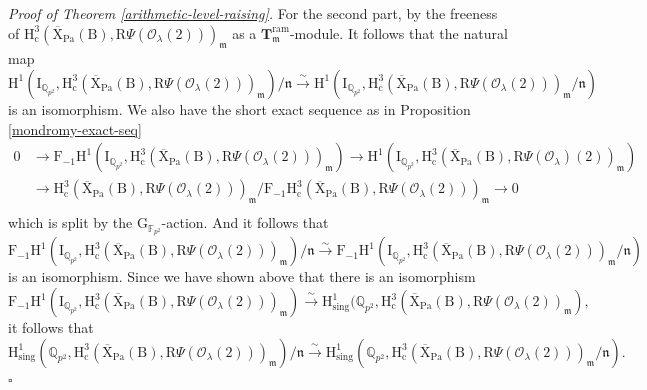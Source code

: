 \documentclass[10pt]{amsart}
\numberwithin{equation}{section}
\theoremstyle{definition}
\newenvironment{myproof}[2] {\emph{Proof of {#1} {#2}.}}{\hfill$\square$}
\def\ram{\mathrm{ram}}
\def\Pa{\mathrm{Pa}}
\def\sing{\mathrm{sing}}
\def\calO{\mathcal{O}}
\def\fracm{\mathfrak{m}}
\def\fracn{\mathfrak{n}}
\def\FF{\mathbb{F}}
\def\QQ{\mathbb{Q}}
\def\bfT{\mathbf{T}}
\def\rmc{\mathrm{c}}
\def\rmB{\mathrm{B}}
\def\rmF{\mathrm{F}}
\def\rmG{\mathrm{G}}
\def\rmH{\mathrm{H}}
\def\rmI{\mathrm{I}}
\def\rmR{\mathrm{R}}
\def\rmX{\mathrm{X}}
\begin{document}
\begin{myproof}{Theorem}{\ref{arithmetic-level-raising}}
For the second part, by the freeness of $\rmH^{3}_{\rmc}(\overline{\rmX}_{\Pa}(\rmB), \rmR\Psi(\calO_{\lambda}(2)))_{\fracm}$ as a $\bfT^{\ram}_{\fracm}$-module. It follows that the natural map
\begin{equation*}
\mathrm{H}^{1}(\mathrm{I}_{\QQ_{p^{2}}}, \mathrm{H}^{3}_{\rmc}(\overline{\rmX}_{\Pa}(\rmB), \rmR\Psi(\calO_{\lambda}(2)))_{\fracm})/\fracn\xrightarrow{\sim} \mathrm{H}^{1}(\mathrm{I}_{\QQ_{p^{2}}}, \mathrm{H}^{3}_{\rmc}(\overline{\rmX}_{\Pa}(\rmB), \rmR\Psi(\calO_{\lambda}(2)))_{\fracm}/\fracn)
\end{equation*}
is an isomorphism. We also have the short exact sequence as in Proposition \ref{mondromy-exact-seq}
\begin{equation*}
\begin{aligned}
0&\rightarrow \mathrm{F}_{-1}\mathrm{H}^{1}(\mathrm{I}_{\QQ_{p^{2}}}, \rmH^{3}_{\mathrm{c}}(\overline{\rmX}_{\Pa}(\rmB), \rmR\Psi(\calO_{\lambda}(2)))_{\fracm}) \rightarrow \rmH^{1}(\rmI_{\QQ_{p^{2}}}, \rmH^{3}_{\mathrm{c}}(\overline{\rmX}_{\Pa}(\rmB), \rmR\Psi(\calO_{\lambda})(2))_{\fracm}) \\
&\rightarrow \rmH^{3}_{\mathrm{c}}(\overline{\rmX}_{\Pa}(\rmB), \rmR\Psi(\calO_{\lambda}(2)))_{\fracm}/ \rmF_{-1}\rmH^{3}_{\mathrm{c}}(\overline{\rmX}_{\Pa}(\rmB), \rmR\Psi(\calO_{\lambda}(2)))_{\fracm}\rightarrow 0\\
\end{aligned}
\end{equation*}
which is split by the $\rmG_{\FF_{p^{2}}}$-action. And it follows that
\begin{equation*}
\mathrm{F}_{-1}\mathrm{H}^{1}(\mathrm{I}_{\QQ_{p^{2}}}, \rmH^{3}_{\mathrm{c}}(\overline{\rmX}_{\Pa}(\rmB), \rmR\Psi(\calO_{\lambda}(2)))_{\fracm})/\fracn\xrightarrow{\sim} \mathrm{F}_{-1}\mathrm{H}^{1}(\mathrm{I}_{\QQ_{p^{2}}}, \rmH^{3}_{\mathrm{c}}(\overline{\rmX}_{\Pa}(\rmB), \rmR\Psi(\calO_{\lambda}(2)))_{\fracm}/\fracn)
\end{equation*}
is an isomorphism.  Since we have shown above that there is an isomorphism
\begin{equation*}
\mathrm{F}_{-1}\mathrm{H}^{1}(\mathrm{I}_{\QQ_{p^{2}}}, \mathrm{H}^{3}_{\rmc}(\overline{\rmX}_{\Pa}(\rmB), \rmR\Psi(\calO_{\lambda}(2)))_{\fracm})\xrightarrow{\sim} \rmH^{1}_{\sing}(\QQ_{p^{2}}, \rmH^{3}_{\rmc}(\overline{\rmX}_{\Pa}(\rmB), \rmR\Psi(\calO_{\lambda}(2))_{\fracm}),
\end{equation*}
it follows that 
\begin{equation*}
\mathrm{H}^{1}_{\sing}({\QQ_{p^{2}}}, \rmH^{3}_{\mathrm{c}}(\overline{\rmX}_{\Pa}(\rmB), \rmR\Psi(\calO_{\lambda}(2)))_{\fracm})/\fracn\xrightarrow{\sim} \mathrm{H}^{1}_{\sing}({\QQ_{p^{2}}}, \rmH^{3}_{\mathrm{c}}(\overline{\rmX}_{\Pa}(\rmB), \rmR\Psi(\calO_{\lambda}(2)))_{\fracm}/\fracn).

\end{equation*}
\end{myproof}
\end{document}
